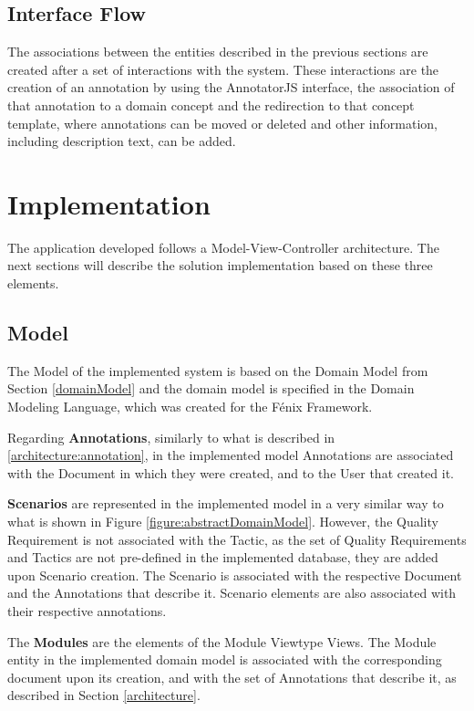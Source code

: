 \documentclass[conference]{IEEEtran}
\begin{document}
\subsection{Interface Flow}
\label{section:interfaceFlow}

The associations between the entities described in the previous sections are created after a set of interactions with the system. These interactions are the creation of an annotation by using the AnnotatorJS interface, the association of that annotation to a domain concept and the redirection to that concept template, where annotations can be moved or deleted and other information, including description text, can be added.

\section{Implementation}
\label{implementation}
The application developed follows a Model-View-Controller architecture. The next sections will describe the solution implementation based on these three elements.

\subsection{Model}
\label{implementation:model}
The Model of the implemented system is based on the Domain Model from Section \ref{domainModel} and the domain model is specified in the Domain Modeling Language, which was created for the F\'{e}nix Framework\cite{cachopo2006combining,cachopo2007development}.

Regarding \textbf{Annotations}, similarly to what is described in \ref{architecture:annotation}, in the implemented model Annotations are associated with the Document in which they were created, and to the User that created it.

\textbf{Scenarios} are represented in the implemented model in a very similar way to what is shown in Figure \ref{figure:abstractDomainModel}. However, the Quality Requirement is not associated with the Tactic, as the set of Quality Requirements and Tactics are not pre-defined in the implemented database, they are added upon Scenario creation. The Scenario is associated with the respective Document and the Annotations that describe it. Scenario elements are also associated with their respective annotations.

The \textbf{Modules} are the elements of the Module Viewtype Views. The Module entity in the implemented domain model is associated with the corresponding document upon its creation, and with the set of Annotations that describe it, as described in Section \ref{architecture}.
\end{document}
